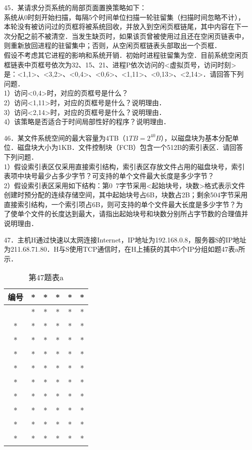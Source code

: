45．某请求分页系统的局部页面置换策略如下：\\
系统从0时刻开始扫描，每隔5个时间单位扫描一轮驻留集（扫描时间忽略不计），本轮没有被访问过的页框将被系统回收，并放入到空闲页框链尾，其中内容在下一次分配之前不被清空．当发生缺页时，如果该页曾被使用过且还在空闲页链表中，则重新放回进程的驻留集中；否则，从空闲页框链表头部取出一个页框．\\

假设不考虑其它进程的影响和系统开销．初始时进程驻留集为空．目前系统空闲页框链表中页框号依次为32、15、21、进程P依次访问的<虚拟页号，访问时刻>是：<1,1>、<3,2>、<0,4>、<0,6>、<1,11>、<0,13>、<2,14>．请回答下列问题．\\
1）访问<0,4>时，对应的页框号是什么？\\
2）访问<1,11>时，对应的页框号是什么？说明理由．\\
3）访问<2,14>时，对应的页框号是什么？说明理由．\\
4）该策略是否适合于时间局部性好的程序？说明理由．

46．某文件系统空间的最大容量为4TB（$1TB=2^{40}B$），以磁盘块为基本分配单位．磁盘块大小为1KB．文件控制块（FCB）包含一个512B的索引表区．请回答下列问题． \\
1）假设索引表区仅采用直接索引结构，索引表区存放文件占用的磁盘块号，索引表项中块号最少占多少字节？可支持的单个文件最大长度是多少字节？ \\
2）假设索引表区采用如下结构：第0~7字节采用<起始块号，块数>格式表示文件创建时预分配的连续存储空间，其中起始块号占6B，块数占2B；剩余504字节采用直接索引结构，一个索引项占6B，则可支持的单个文件最大长度是多少字节？为了使单个文件的长度达到最大，请指出起始块号和块数分别所占字节数的合理值并说明理由．

47．主机H通过快速以太网连接Internet，IP地址为192.168.0.8，服务器S的IP地址为211.68.71.80．H与S使用TCP通信时，在H上捕获的其中5个IP分组如题47表a所示．
\begin{table}[ht]
\centering
\caption{第47题表a}\label{CSN12_tab3}
\begin{tabular}{|c|c|c|c|c|c|}
\hline
编号 & * & * & * & * & * \\
\hline
 & * & * & * & * & * \\
\hline
* & * & * & * & * & * \\
\hline
* & * & * & * & * & * \\
\hline
* & * & * & * & * & * \\
\hline
* & * & * & * & * & * \\
\hline
* & * & * & * & * & * \\
\hline
* & * & * & * & * & * \\
\hline
* & * & * & * & * & * \\
\hline
* & * & * & * & * & * \\
\hline
* & * & * & * & * & * \\
\hline
\end{tabular}
\end{table}



